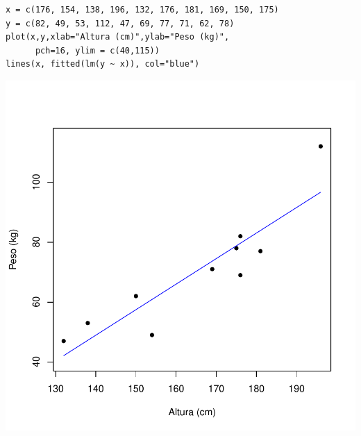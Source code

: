 \documentclass[14pt,aspectratio=1610]{beamer}
\begin{document}
\begin{frame}[fragile]{}
\frametitle{ }
\begin{block}{}
\begin{center}

\begin{verbatim}
x = c(176, 154, 138, 196, 132, 176, 181, 169, 150, 175)
y = c(82, 49, 53, 112, 47, 69, 77, 71, 62, 78)
plot(x,y,xlab="Altura (cm)",ylab="Peso (kg)",
      pch=16, ylim = c(40,115))
lines(x, fitted(lm(y ~ x)), col="blue")    
\end{verbatim}

\end{center}
\end{block}
\vspace{-1.3cm}
\begin{center}
\includegraphics{Figuras/Aula20-002.pdf}
\end{center}
\end{frame}
\end{document}

